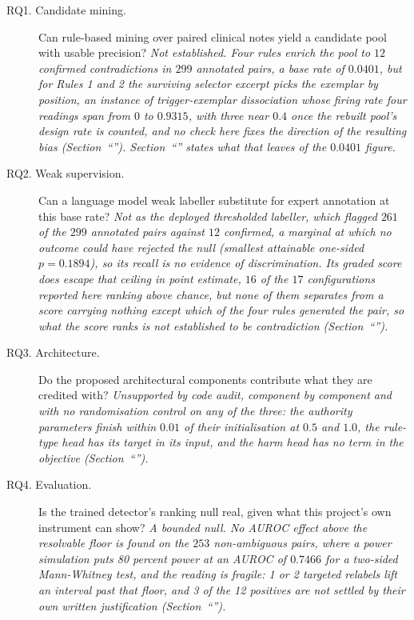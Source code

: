 \begin{description}

\item[RQ1. Candidate mining.] Can rule-based mining over paired clinical notes yield a candidate
pool with usable precision?
\emph{Not established. Four rules enrich the pool to $12$ confirmed contradictions in $299$
annotated pairs, a base rate of $0.0401$, but for Rules 1 and 2 the surviving selector excerpt
picks the exemplar by position, an instance of trigger-exemplar dissociation whose firing rate
four readings span from $0$ to $0.9315$, with three near $0.4$ once the rebuilt pool's design
rate is counted, and no check here fixes the
direction of the resulting bias (Section~``'').
Section~``'' states what that leaves of the $0.0401$ figure.}

\item[RQ2. Weak supervision.] Can a language model weak labeller substitute for expert
annotation at this base rate?
\emph{Not as the deployed thresholded labeller, which flagged $261$ of the $299$ annotated
pairs against $12$ confirmed, a marginal at which no outcome could have rejected the null
(smallest attainable one-sided $p = 0.1894$), so its recall is no evidence of discrimination.
Its graded score does escape that ceiling in point estimate, $16$ of the $17$ configurations
reported here ranking above chance, but none of them separates from a score carrying nothing except
which of the four rules generated the pair, so what the score ranks is not established to be
contradiction (Section~``'').}

\item[RQ3. Architecture.] Do the proposed architectural components contribute what they are
credited with?
\emph{Unsupported by code audit, component by component and with no randomisation control on any
of the three: the authority parameters finish within $0.01$ of their initialisation at $0.5$ and
$1.0$, the rule-type head has its target in its input, and the harm head has no term in the
objective (Section~``'').}

\item[RQ4. Evaluation.] Is the trained detector's ranking null real, given what this project's
own instrument can show?
\emph{A bounded null. No AUROC effect above the resolvable floor is found on the $253$
non-ambiguous pairs, where a power simulation puts 80 percent power at an AUROC of $0.7466$ for
a two-sided Mann-Whitney test, and the reading is fragile: 1 or 2 targeted relabels lift an
interval past that floor, and 3 of the 12 positives are not settled by their own written
justification (Section~``'').}

\end{description}

